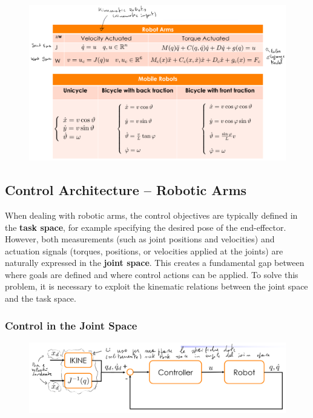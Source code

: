 \begin{figure}[H]
    \centering
    \includegraphics[width=1\linewidth]{imgs/models_recap.png}
\end{figure}

\hfill

\subsection{Control Architecture – Robotic Arms}

When dealing with robotic arms, the control objectives are typically defined in the \textbf{task space}, for example specifying the desired pose of the end-effector. However, both measurements (such as joint positions and velocities) and actuation signals (torques, positions, or velocities applied at the joints) are naturally expressed in the \textbf{joint space}. This creates a fundamental gap between where goals are defined and where control actions can be applied.  
To solve this problem, it is necessary to exploit the kinematic relations between the joint space and the task space.

\subsubsection*{Control in the Joint Space}

\begin{figure}[H]
    \centering
    \includegraphics[width=1\linewidth]{imgs/control_joint_space_robotic_arms.png}
\end{figure}

